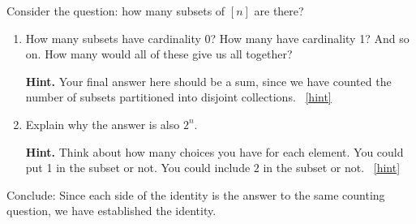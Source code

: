 \documentclass{book}
\begin{document}
\setcounter{project}{78}
\addtocounter{project}{-1}
\begin{activity}[]\label{activity-pascalrow-dc}
\hypertarget{p-595}{}%
Consider the question: how many subsets of \([n]\) are there?%
\begin{enumerate}[font=\bfseries,label=(\alph*),ref=\alph*]
\item\label{task-111} \hypertarget{p-596}{}%
How many subsets have cardinality 0?  How many have cardinality 1?  And so on.  How many would all of these give us all together?%
\par\smallskip%
\noindent\textbf{Hint.}\hypertarget{hint-34}{}\quad%
\hypertarget{p-597}{}%
Your final answer here should be a sum, since we have counted the number of subsets partitioned into disjoint collections.%
~\hfill{\tiny\hyperlink{a-78.a}{[hint]}\hypertarget{q-78.a}{}}\item\label{task-112} \hypertarget{p-598}{}%
Explain why the answer is also \(2^n\).%
\par\smallskip%
\noindent\textbf{Hint.}\hypertarget{hint-35}{}\quad%
\hypertarget{p-599}{}%
Think about how many choices you have for each element.  You could put 1 in the subset or not.  You could include \(2\) in the subset or not.%
~\hfill{\tiny\hyperlink{a-78.b}{[hint]}\hypertarget{q-78.b}{}}\end{enumerate}
\bigbreak
\hypertarget{p-600}{}%
Conclude: Since each side of the identity is the answer to the same counting question, we have established the identity.%
\end{activity}

\clearpage
\end{document}
